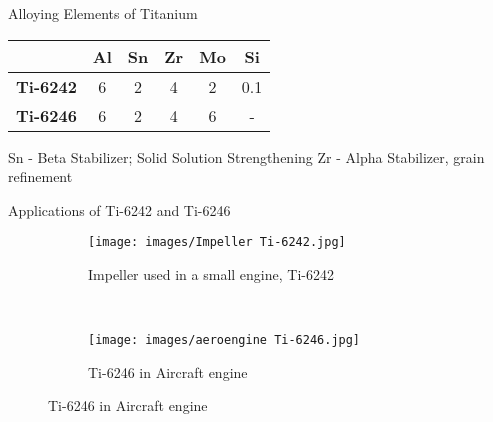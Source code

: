 \documentclass[10pt]{beamer}
\begin{document}
{%

\begin{frame}[fragile]{Alloying Elements of Titanium}

\begin{table}[]
\centering
\begin{tabular}{@{}cccccc@{}}
\toprule
 & \textbf{Al} & \textbf{Sn} & \textbf{Zr} & \textbf{Mo} & \textbf{Si} \\ \midrule
\textbf{Ti-6242} & 6 & 2 & 4 & 2 & 0.1 \\
\textbf{Ti-6246} & 6 & 2 & 4 & 6 & - \\ \bottomrule
\end{tabular}
\end{table}
Sn - Beta Stabilizer; Solid Solution Strengthening
Zr - Alpha Stabilizer, grain refinement
\end{frame}
}

{%
\begin{frame}[fragile]{Applications of Ti-6242 and Ti-6246}

\begin{figure}[H]
    \centering
    \begin{subfigure}{0.45\textwidth}
        \texttt{[image: images/Impeller Ti-6242.jpg]}
        \caption{Impeller used in a small engine, Ti-6242}
        \end{subfigure}
    ~
    \begin{subfigure}{0.45\textwidth}
        \texttt{[image: images/aeroengine Ti-6246.jpg]}
        \caption{Ti-6246 in Aircraft engine}
    \end{subfigure}
  
    
\end{figure}

\end{frame}
}
\end{document}
